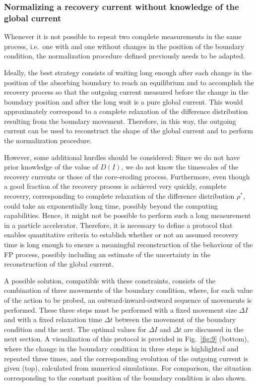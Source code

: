 
\subsubsection{Normalizing a recovery current without knowledge of the global current}


Whenever it is not possible to repeat two complete measurements in the same process, i.e.\ one with and one without changes in the position of the boundary condition, the normalization procedure defined previously needs to be adapted.

Ideally, the best strategy consists of waiting long enough after each change in the position of the absorbing boundary to reach an equilibrium and to accomplish the recovery process so that the outgoing current measured before the change in the boundary position and after the long wait is a pure global current. This would approximately correspond to a complete relaxation of the difference distribution resulting from the boundary movement. Therefore, in this way, the outgoing current can be used to reconstruct the shape of the global current and to perform the normalization procedure.

However, some additional hurdles should be considered: Since we do not have prior knowledge of the value of $D(I)$, we do not know the timescales of the recovery currents or those of the core-eroding process. Furthermore, even though a good fraction of the recovery process is achieved very quickly, complete recovery, corresponding to complete relaxation of the difference distribution $\rho^\ast$, could take an exponentially long time, possibly beyond the computing capabilities. Hence, it might not be possible to perform such a long measurement in a particle accelerator. Therefore, it is necessary to define a protocol that enables quantitative criteria to establish whether or not an assumed recovery time is long enough to ensure a meaningful reconstruction of the behaviour of the FP process, possibly including an estimate of the uncertainty in the reconstruction of the global current.

A possible solution, compatible with these constraints, consists of the combination of three movements of the boundary condition, where, for each value of the action to be probed, an outward-inward-outward sequence of movements is performed. These three steps must be performed with a fixed movement size $\Delta I$ and with a fixed relaxation time $\Delta t$ between the movement of the boundary condition and the next. The optimal values for $\Delta I$ and $\Delta t$ are discussed in the next section. A visualization of this protocol is provided in Fig.~\ref{fig:9} (bottom), where the change in the boundary condition in three steps is highlighted and repeated three times, and the corresponding evolution of the outgoing current is given (top), calculated from numerical simulations. For comparison, the situation corresponding to the constant position of the boundary condition is also shown.

